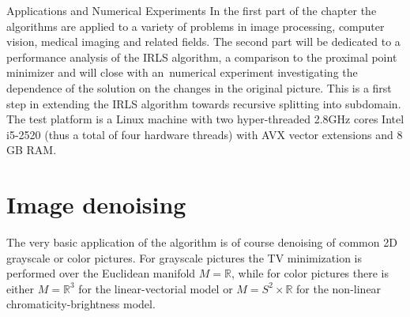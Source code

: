 \begin{chapter}{Applications and Numerical Experiments}
\label{ch:numericalexperiments}
In the first part of the chapter the algorithms are applied to a variety of problems in image processing, computer vision, medical imaging and related fields.
The second part will be dedicated to a performance analysis of the IRLS algorithm, a comparison to the proximal point minimizer and will close with an\ numerical experiment investigating the 
dependence of the solution on the changes in the original picture. This is a first step in extending the IRLS algorithm towards recursive splitting into subdomain.\\

The test platform is a Linux machine with two hyper-threaded 2.8GHz cores Intel i5-2520 (thus a total of four hardware threads)
with AVX vector extensions and 8 GB RAM. 


\section{Image denoising} %
\label{sec:image denoising}
The very basic application of the algorithm is of course denoising of common 2D grayscale or color pictures.
For grayscale pictures the TV minimization is performed over the Euclidean manifold $M=\mathbb{R}$, while for color
pictures there is either $M=\mathbb{R}^3$ for the linear-vectorial model or
$M=S^2\times\mathbb{R}$ for the non-linear chromaticity-brightness model.


\end{chapter}
